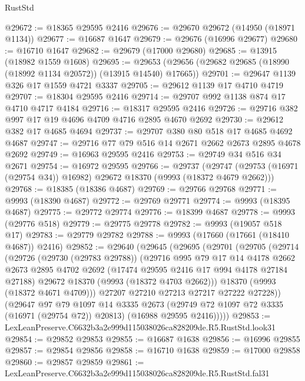 \begin{lexlean}{RustStd}
\begin{coremodule}
@29672 := @18365 @29595 @2416
@29676 := @29670 @29672 (@14950 (@18971 @1134))
@29677 := @16687 @1647
@29679 := @29676 (@16996 @29677)
@29680 := @16710 @1647
@29682 := @29679 (@17000 @29680)
@29685 := @13915 (@18982 @1559 @1608)
@29695 := @29653 (@29656 (@29682 @29685 (@18990 (@18992 @1134 @20572)) (@13915 @14540) @17665))
@29701 := @29647 @1139 @326 @17 @1559 @4721 @3337
@29705 := @29612 @1139 @17 @4710 @4719
@29707 := @18304 @29595 @2416
@29714 := @29707 @992 @1138 @874 @17 @4710 @4717 @4184
@29716 := @18317 @29595 @2416
@29726 := @29716 @382 @997 @17 @19 @4696 @4709 @4716 @2895 @4670 @2692
@29730 := @29612 @382 @17 @4685 @4694
@29737 := @29707 @380 @80 @518 @17 @4685 @4692 @4687
@29747 := @29716 @77 @79 @516 @14 @2671 @2662 @2673 @2895 @4678 @2692
@29749 := @16963 @29595 @2416
@29753 := @29749 @34 @516 @34 @2671
@29754 := @16972 @29595
@29766 := @29737
    (@29747 (@29753 (@16971 (@29754 @34)) @16982) @29672 @18370 (@9993 (@18372 @4679 @2662)))
@29768 := @18385 (@18386 @4687)
@29769 := @29766 @29768
@29771 := @9993 (@18390 @4687)
@29772 := @29769 @29771
@29774 := @9993 (@18395 @4687)
@29775 := @29772 @29774
@29776 := @18399 @4687
@29778 := @9993 (@29776 @518)
@29779 := @29775 @29778
@29782 := @9993 (@19057 @518 @17)
@29783 := @29779 @29782
@29788 := @9993 (@17660 (@17661 (@18410 @4687)) @2416)
@29852 := @29640
    (@29645
      (@29695
        (@29701
          (@29705
            (@29714
              (@29726
                (@29730 (@29783 @29788))
                (@29716
                  @995
                  @79
                  @17
                  @14
                  @4178
                  @2662
                  @2673
                  @2895
                  @4702
                  @2692
                  (@17474 @29595 @2416 @17 @994 @4178 @27184 @27188)
                  @29672
                  @18370
                  (@9993 (@18372 @4703 @2662)))
                @18370
                (@9993 (@18372 @4671 @4709)))
              @27207
              @27210
              @27213
              @27217
              @27222
              @27228))
          (@29647
            @97
            @79
            @1097
            @14
            @3335
            @2673
            (@29749 @72 @1097 @72 @3335 (@16971 (@29754 @72)) @20813)
            (@16988 @29595 @2416)))))
@29853 := LexLeanPreserve.C6632b3a2e999d115038026ca828209de.R5.RustStd.look31
@29854 := @29852 @29853
@29855 := @16687 @1638
@29856 := @16996 @29855
@29857 := @29854 @29856
@29858 := @16710 @1638
@29859 := @17000 @29858
@29860 := @29857 @29859
@29861 := LexLeanPreserve.C6632b3a2e999d115038026ca828209de.R5.RustStd.fal31

\end{coremodule}
\end{lexlean}
